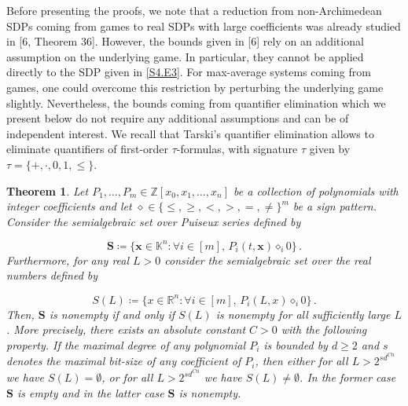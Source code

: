 \documentclass[10pt,a4paper]{article}
\newtheorem{theorem}{Theorem}
\theoremstyle{definition}
\begin{document}
Before presenting the proofs, we note that a reduction from non-Archimedean SDPs coming from games to real SDPs with large coefficients was already studied in [6, Theorem 36]. However, the bounds given in [6] rely on an additional assumption on the underlying game. In particular, they cannot be applied directly to the SDP given in \eqref{S4.E3}. For max-average systems coming from games, one could overcome this restriction by perturbing the underlying game slightly. Nevertheless, the bounds coming from quantifier elimination which we present below do not require any additional assumptions and can be of independent interest. We recall that Tarski’s quantifier elimination allows to eliminate quantifiers of first-order $\tau$-formulas, with signature $\tau$ given by $\tau=\{+,\cdot,0,1,\leq\}$.

\setcounter{theorem}{6}
\begin{theorem}\label{Thmtheorem7}
Let $P_{1},\dots,P_{m}\in\mathbb{Z}[x_{0},x_{1},\dots,x_{n}]$ be a collection of polynomials with integer coefficients and let $\diamond\in\{\leq,\geq,<,>,=,\neq\}^{m}$ be a sign pattern. Consider the semialgebraic set over Puiseux series defined by


\[
\bm{S}\coloneqq\{\bm{x}\in\mathbb{K}^{n}\colon\forall i\in[m],\,P_{i}(t,\bm{x})\diamond_{i}0\}\,.
\]
Furthermore, for any real $L>0$ consider the semialgebraic set over the real numbers defined by


\[
S(L)\coloneqq\{x\in\mathbb{R}^{n}\colon\forall i\in[m],\,P_{i}(L,x)\diamond_{i}0\}\,.
\]
Then, $\bm{S}$ is nonempty if and only if $S(L)$ is nonempty for all sufficiently large $L$. More precisely, there exists an absolute constant $C>0$ with the following property. If the maximal degree of any polynomial $P_{i}$ is bounded by $d\geq 2$ and $s$ denotes the maximal bit-size of any coefficient of $P_{i}$, then either for all $L>2^{sd^{Cn}}$ we have $S(L)=\emptyset$, or for all $L>2^{sd^{Cn}}$ we have $S(L)\neq\emptyset$. In the former case $\bm{S}$ is empty and in the latter case $\bm{S}$ is nonempty.

\end{theorem}
\end{document}
